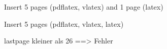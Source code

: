 \documentclass[a4paper]{article}
\begin{document}
Insert 5 pages (pdflatex, vlatex) and 1 page (latex)


Insert 5 pages (pdflatex, vlatex, latex)



lastpage kleiner als 26 ==> Fehler

\end{document}
